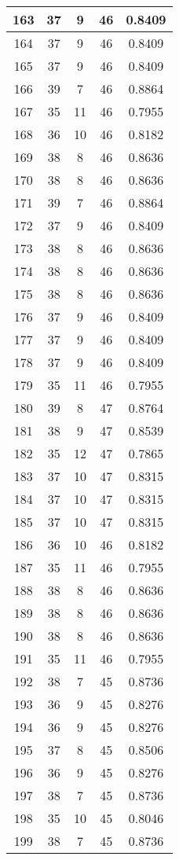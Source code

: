 \documentclass[letterpaper, 12pt]{article}
\begin{document}
\begin{longtable}{|c|c|c|c|c|}
\hline
163 & 37 & 9 & 46 & 0.8409 \\
\hline
164 & 37 & 9 & 46 & 0.8409 \\
\hline
165 & 37 & 9 & 46 & 0.8409 \\
\hline
166 & 39 & 7 & 46 & 0.8864 \\
\hline
167 & 35 & 11 & 46 & 0.7955 \\
\hline
168 & 36 & 10 & 46 & 0.8182 \\
\hline
169 & 38 & 8 & 46 & 0.8636 \\
\hline
170 & 38 & 8 & 46 & 0.8636 \\
\hline
171 & 39 & 7 & 46 & 0.8864 \\
\hline
172 & 37 & 9 & 46 & 0.8409 \\
\hline
173 & 38 & 8 & 46 & 0.8636 \\
\hline
174 & 38 & 8 & 46 & 0.8636 \\
\hline
175 & 38 & 8 & 46 & 0.8636 \\
\hline
176 & 37 & 9 & 46 & 0.8409 \\
\hline
177 & 37 & 9 & 46 & 0.8409 \\
\hline
178 & 37 & 9 & 46 & 0.8409 \\
\hline
179 & 35 & 11 & 46 & 0.7955 \\
\hline
180 & 39 & 8 & 47 & 0.8764 \\
\hline
181 & 38 & 9 & 47 & 0.8539 \\
\hline
182 & 35 & 12 & 47 & 0.7865 \\
\hline
183 & 37 & 10 & 47 & 0.8315 \\
\hline
184 & 37 & 10 & 47 & 0.8315 \\
\hline
185 & 37 & 10 & 47 & 0.8315 \\
\hline
186 & 36 & 10 & 46 & 0.8182 \\
\hline
187 & 35 & 11 & 46 & 0.7955 \\
\hline
188 & 38 & 8 & 46 & 0.8636 \\
\hline
189 & 38 & 8 & 46 & 0.8636 \\
\hline
190 & 38 & 8 & 46 & 0.8636 \\
\hline
191 & 35 & 11 & 46 & 0.7955 \\
\hline
192 & 38 & 7 & 45 & 0.8736 \\
\hline
193 & 36 & 9 & 45 & 0.8276 \\
\hline
194 & 36 & 9 & 45 & 0.8276 \\
\hline
195 & 37 & 8 & 45 & 0.8506 \\
\hline
196 & 36 & 9 & 45 & 0.8276 \\
\hline
197 & 38 & 7 & 45 & 0.8736 \\
\hline
198 & 35 & 10 & 45 & 0.8046 \\
\hline
199 & 38 & 7 & 45 & 0.8736 \\
\hline
\end{longtable}
\end{document}
